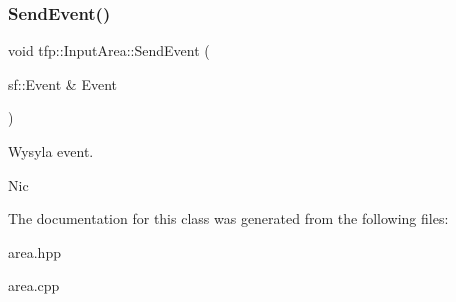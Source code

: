 \subsubsection{\texorpdfstring{Send\+Event()}{SendEvent()}}
{\footnotesize\ttfamily void tfp\+::\+Input\+Area\+::\+Send\+Event (\begin{DoxyParamCaption}\item[{sf\+::\+Event \&}]{Event }\end{DoxyParamCaption})}



Wysyla event. 

Nic 

The documentation for this class was generated from the following files\+:\begin{DoxyCompactItemize}
\item 
area.\+hpp\item 
area.\+cpp\end{DoxyCompactItemize}
